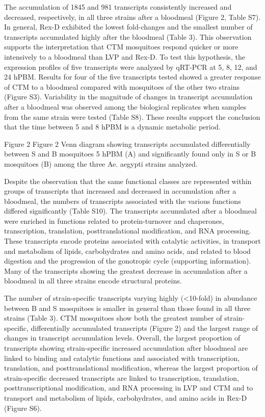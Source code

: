 The accumulation of 1845 and 981 transcripts consistently increased and decreased, respectively, in all three strains after a bloodmeal (Figure 2, Table S7). In general, Rex-D exhibited the lowest fold-changes and the smallest number of transcripts accumulated highly after the bloodmeal (Table 3). This observation supports the interpretation that CTM mosquitoes respond quicker or more intensively to a bloodmeal than LVP and Rex-D. To test this hypothesis, the expression profiles of five transcripts were analyzed by qRT-PCR at 5, 8, 12, and 24 hPBM. Results for four of the five transcripts tested showed a greater response of CTM to a bloodmeal compared with mosquitoes of the other two strains (Figure S3). Variability in the magnitude of changes in transcript accumulation after a bloodmeal was observed among the biological replicates when samples from the same strain were tested (Table S8). These results support the conclusion that the time between 5 and 8 hPBM is a dynamic metabolic period.

Figure 2 
Figure 2 
Venn diagram showing transcripts accumulated differentially between S and B mosquitoes 5 hPBM (A) and significantly found only in S or B mosquitoes (B) among the three Ae. aegypti strains analyzed.


Despite the observation that the same functional classes are represented within groups of transcripts that increased and decreased in accumulation after a bloodmeal, the numbers of transcripts associated with the various functions differed significantly (Table S10). The transcripts accumulated after a bloodmeal were enriched in functions related to protein-turnover and chaperones, transcription, translation, posttranslational modification, and RNA processing. These transcripts encode proteins associated with catalytic activities, in transport and metabolism of lipids, carbohydrates and amino acids, and related to blood digestion and the progression of the gonotropic cycle (supporting information). Many of the transcripts showing the greatest decrease in accumulation after a bloodmeal in all three strains encode structural proteins.

The number of strain-specific transcripts varying highly (<10-fold) in abundance between B and S mosquitoes is smaller in general than those found in all three strains (Table 3). CTM mosquitoes show both the greatest number of strain-specific, differentially accumulated transcripts (Figure 2) and the largest range of changes in transcript accumulation levels. Overall, the largest proportion of transcripts showing strain-specific increased accumulation after bloodmeal are linked to binding and catalytic functions and associated with transcription, translation, and posttranslational modification, whereas the largest proportion of strain-specific decreased transcripts are linked to transcription, translation, posttranscriptional modification, and RNA processing in LVP and CTM and to transport and metabolism of lipids, carbohydrates, and amino acids in Rex-D (Figure S6).


